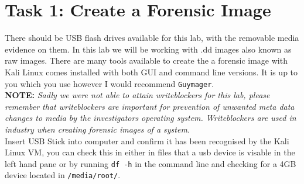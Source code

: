 \documentclass[a4paper,11pt]{article}
\begin{document}
\newpage
\section{Task 1: Create a Forensic Image}
There should be USB flash drives available for this lab, with the removable media evidence on them.  In this lab we will be working with .dd images also known as raw images. There are many tools available to create the a forensic image with Kali Linux comes installed with both GUI and command line versions. It is up to you which you use however I would recommend \texttt{Guymager}.\\

\textbf{NOTE:} \textit{Sadly we were not able to attain writeblockers for this lab, please remember that writeblockers are important for prevention of unwanted meta data changes to media by the investigators operating system. Writeblockers are used in industry when creating forensic images of a system.}\\

Insert USB Stick into computer and confirm it has been recognised by the Kali Linux VM, you can check this in either in files that a usb device is visable in the left hand pane or by running \texttt{df -h} in the command line and checking for a 4GB device located in \texttt{/media/root/}. \\
\end{document}

